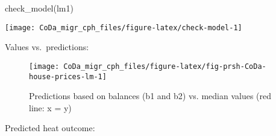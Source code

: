 \documentclass[
  12pt,
]{article}
\newenvironment{Shaded}{\begin{snugshade}}{\end{snugshade}}
\newcommand{\AttributeTok}[1]{\textcolor[rgb]{0.77,0.63,0.00}{#1}}
\newcommand{\DecValTok}[1]{\textcolor[rgb]{0.00,0.00,0.81}{#1}}
\newcommand{\FunctionTok}[1]{\textcolor[rgb]{0.00,0.00,0.00}{#1}}
\newcommand{\NormalTok}[1]{#1}
\newcommand{\OtherTok}[1]{\textcolor[rgb]{0.56,0.35,0.01}{#1}}
\newcommand{\SpecialCharTok}[1]{\textcolor[rgb]{0.00,0.00,0.00}{#1}}
\newcommand{\StringTok}[1]{\textcolor[rgb]{0.31,0.60,0.02}{#1}}
\begin{document}
\begin{Shaded}
\begin{Highlighting}[]
\FunctionTok{check\_model}\NormalTok{(lm1)}
\end{Highlighting}
\end{Shaded}

\begin{center}\texttt{[image: CoDa\_migr\_cph\_files/figure-latex/check-model-1]} \end{center}

Values vs.~predictions:

\begin{Shaded}
\end{Shaded}

\begin{figure}[H]

{\centering \texttt{[image: CoDa\_migr\_cph\_files/figure-latex/fig-prsh-CoDa-house-prices-lm-1]} 

}

\caption{Predictions based on balances (b1 and b2) vs. median values (red line: x = y)}\label{fig:fig-prsh-CoDa-house-prices-lm}
\end{figure}

Predicted heat outcome:
\end{document}
